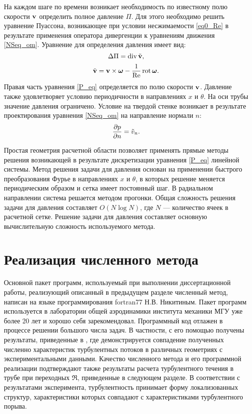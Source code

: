 На каждом шаге по времени возникает необходимость по известному полю скорости $\mathbf{v}$ определить полное давление $\Pi$. Для этого необходимо решить уравнение Пуассона, возникающее при условии несжимаемости \eqref{eq0_Re} в результате применения оператора дивергенции к уравнениям движения \eqref{NSeq_om}. Уравнение для определения давления имеет вид:
\begin{equation}\label{P_eq}
\mathop{}\!\Delta \Pi = \mathop{}\!\operatorname{div} \tilde {\mathbf{v}},
\end{equation}
$$
\tilde {\mathbf{v}} =  \mathbf{v} \times \mbox{\boldmath$\omega$} - \frac{1}{\operatorname{Re}} \mathop{}\!\operatorname{rot} \mbox{\boldmath$\omega$}.
$$
Правая часть уравнения \eqref{P_eq} определяется по полю скорости $\mathbf{v}$. Давление также удовлетворяет условию периодичности в направлениях $x$ и $\theta$. На оси трубы значение давления ограничено. Условие на твердой стенке возникает в результате проектирования уравнения \eqref{NSeq_om} на направление нормали $n$:
$$
\frac{\partial p}{\partial n} = \tilde v_n.
$$


Простая геометрия расчетной области позволяет применять прямые методы решения возникающей в результате дискретизации уравнения \eqref{P_eq} линейной системы. Метод решения задачи для давления основан на применении быстрого преобразования Фурье в направлениях $x$ и $\theta$, в которых решение меняется периодическим образом и сетка имеет постоянный шаг. В радиальном направлении система решается методом прогонки. Общая сложность решения задачи для давления составляет $O(N \log N)$, где $N$ --- количество ячеек в расчетной сетке. Решение задачи для давления составляет основную вычислительную сложность используемого метода. 


\section{Реализация численного метода}

Основной пакет программ, используемый при выполнении диссертационной работы, реализующий описанный в предыдущем разделе численный метод, написан на языке программирования fortran77 Н.В. Никитиным. Пакет программ используется в лаборатории общей аэродинамики института механики МГУ уже более 20 лет и хорошо себя зарекомендовал. Программный код отлажен в процессе решении большого числа задач. В частности, с его помощью получены результаты, приведенные в \cite{Nikitin2006}, где демонстрируется совпадение полученных численно характеристик турбулентных потоков в различных геометриях с экспериментальными данными. Качество численного метода и его программной реализации подтверждают также результаты расчета турбулентного течения в трубе при переходных $\Re$, приведенные в следующем разделе. В соответствии с результатами эксперимента, турбулентность принимает форму локализованных структур, характеристики которых совпадают с характеристиками турбулентного порыва. 


